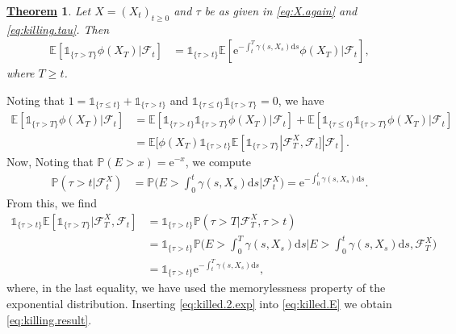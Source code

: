 \documentclass[12pt]{book}
\let\varphi\phi
\numberwithin{equation}{chapter}
\theoremstyle{plain}
\newtheorem{theorem}{\underline{Theorem}}
\numberwithin{theorem}{section}
\theoremstyle{definition}
\numberwithin{exercise}{chapter}
\let\oldendproof\endproof
\renewenvironment{proof}[1][\proofname]{%
  \oldproof[\scshape\underline{#1}]%
}{\oldendproof}
\newcommand{\<}{\langle}
\renewcommand{\>}{\rangle}
\renewcommand{\(}{\left(}
\renewcommand{\)}{\right)}
\renewcommand{\[}{\left[}
\renewcommand{\]}{\right]}
\newcommand\Eb{\mathds{E}}
\newcommand\Ib{\mathds{1}} 	%
\newcommand\Pb{\mathds{P}}
\newcommand\Fc{\mathscr{F}}
\newcommand\gam{\gamma}
\newcommand\dd{\mathrm{d}}
\newcommand\ee{\mathrm{e}}
\begin{document}
\begin{theorem}
Let $X = (X_t)_{t \geq 0}$ and $\tau$ be as given in \eqref{eq:X.again} and \eqref{eq:killing.tau}.  Then
\begin{align}
\Eb[ \Ib_{\{ \tau > T \}} \varphi(X_T) | \Fc_t ]
	&=	\Ib_{\{\tau > t\}} \Eb[ \ee^{- \int_t^T \gam(s,X_s) \dd s} \varphi(X_T)  | \Fc_t ] , \label{eq:killing.result}
\end{align}
where $T \geq t$.
\end{theorem}

\begin{proof}
Noting that $1 = \Ib_{\{\tau \leq t\}} + \Ib_{\{\tau > t\}}$ and $\Ib_{\{\tau \leq t\}} \Ib_{\{\tau > T\}} = 0$, we have
\begin{align}
\Eb[ \Ib_{\{ \tau > T \}} \varphi(X_T) | \Fc_t ]
	&=	\Eb[ \Ib_{\{\tau > t\}} \Ib_{\{ \tau > T \}} \varphi(X_T) | \Fc_t ] +  \Eb[ \Ib_{\{\tau \leq t\}} \Ib_{\{ \tau > T \}} \varphi(X_T) | \Fc_t ] \\
	&=	\Eb[ \varphi(X_T) \Ib_{\{\tau > t\}}  \Eb[ \Ib_{\{ \tau > T \}}| \Fc_T^X, \Fc_t ]  | \Fc_t ] .  \label{eq:killed.E}
\end{align}
Now, Noting that $\Pb( E > x ) = \ee^{-x}$, we compute
\begin{align}
\Pb( \tau > t | \Fc_t^X )
	&=	\Pb\Big( E > \int_0^t \gam(s,X_s) \dd s \Big| \Fc_t^X \Big) 
	=	\ee^{- \int_0^t \gam(s,X_s) \dd s} .
\end{align}
From this, we find
\begin{align}
\Ib_{\{\tau > t\}} \Eb[ \Ib_{\{ \tau > T \}}| \Fc_T^X, \Fc_t ]
	&=	\Ib_{\{\tau > t\}} \Pb( \tau > T | \Fc_T^X, \tau > t ) \\
	&=	\Ib_{\{\tau > t\}} \Pb \Big( E > \int_0^T \gam(s,X_s) \dd s \Big| E > \int_0^t \gam(s,X_s) \dd s , \Fc_T^X \Big) \\
	&=	\Ib_{\{\tau > t\}} \ee^{- \int_t^T \gam(s,X_s) \dd s} , \label{eq:killed.2.exp}
\end{align}
where, in the last equality, we have used the memorylessness property of the exponential distribution.
Inserting \eqref{eq:killed.2.exp} into \eqref{eq:killed.E} we obtain \eqref{eq:killing.result}.
\end{proof}
\end{document}
